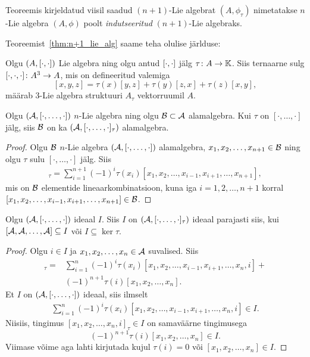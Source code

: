 Teoreemis kirjeldatud viisil saadud $(n+1)$-Lie algebrat $(A, \phi_\tau)$
nimetatakse $n$-Lie algebra $(A, \phi)$ poolt \emph{indutseeritud}
$(n+1)$-Lie algebraks.

Teoreemist~\ref{thm:n+1_lie_alg} saame teha olulise järlduse:

\begin{jar}
    Olgu $(A, \left[ \cdot, \cdot \right])$ Lie algebra ning olgu antud
    $\left[ \cdot, \cdot \right]$ jälg $\tau \colon A \to \mathbb{K}$. Siis ternaarne sulg
    $[ \cdot, \cdot, \cdot ] \colon A^3 \to A$, mis on defineeritud
    valemiga
    \[
        [x, y, z] = \tau(x)[y, z] + \tau(y)[z, x] + \tau(z)[x, y],
    \]
    määrab $3$-Lie algebra struktuuri $A_\tau$ vektorruumil $A$.
\end{jar}

\begin{lau}
    Olgu $(\mathcal{A}, [\cdot, \dots, \cdot])$ $n$-Lie algebra ning olgu
    $\mathcal{B} \subset \mathcal{A}$ alamalgebra. Kui $\tau$ on $[\cdot, \dots, \cdot]$ jälg,
    siis $\mathcal{B}$ on ka $(\mathcal{A}, [\cdot, \dots, \cdot]_\tau)$ alamalgebra.
\end{lau}

\begin{proof}
    Olgu $\mathcal{B}$ $n$-Lie algebra $(\mathcal{A}, [\cdot, \dots, \cdot])$ alamalgebra,
    $x_1, x_2, \dots, x_{n+1} \in \mathcal{B}$ ning olgu $\tau$ sulu $[\cdot, \dots, \cdot]$
    jälg. Siis
    \begin{align*}
        [x_1, x_2, \dots, x_{n+1}]_\tau =  \sum_{i=1}^{n+1} (-1)^i \tau(x_i)
        [x_1, x_2, \dots, x_{i-1}, x_{i+1}, \dots, x_{n+1}],
    \end{align*}
    mis on $\mathcal{B}$ elementide lineaarkombinatsioon, kuna iga $i = 1, 2, \dots, n+1$
    korral $[x_1, x_2, \dots, x_{i-1}, x_{i+1}, \dots, x_{n+1}] \in \mathcal{B}$.
\end{proof}

\begin{lau}
    Olgu $(\mathcal{A}, [\cdot, \dots, \cdot])$ ideaal $I$. Siis $I$ on
    $(\mathcal{A}, [\cdot, \dots, \cdot]_\tau)$ ideaal parajasti siis, kui
    $[\mathcal{A}, \mathcal{A}, \dots, \mathcal{A}] \subseteq I$ või $I \subseteq \ker \tau$.
\end{lau}

\begin{proof}
    Olgu $i \in I$ ja $x_1, x_2, \dots, x_n \in \mathcal{A}$ suvalised. Siis
    \begin{align*}
        [x_1, x_2, \dots, x_n, i]_\tau =  &\sum_{i=1}^{n} (-1)^i \tau(x_i)
        [x_1, x_2, \dots, x_{i-1}, x_{i+1}, \dots, x_n, i] + \\
        &(-1)^{n+1} \tau(i) [x_1, x_2, \dots, x_n].
    \end{align*}
    Et $I$ on $(\mathcal{A}, [\cdot, \dots, \cdot])$ ideaal, siis ilmselt
    \begin{align*}
        \sum_{i=1}^{n} (-1)^i \tau(x_i)
        [x_1, x_2, \dots, x_{i-1}, x_{i+1}, \dots, x_n, i] \in I.
    \end{align*}
    Niisiis, tingimus $[x_1, x_2, \dots, x_n, i]_\tau \in I$ on
    samaväärne tingimusega
    \[ (-1)^{n+1} \tau(i) [x_1, x_2, \dots, x_n] \in I. \]
    Viimase võime aga lahti kirjutada kujul
    $\tau(i) = 0$ või $[x_1, x_2, \dots, x_n] \in I$.
\end{proof}